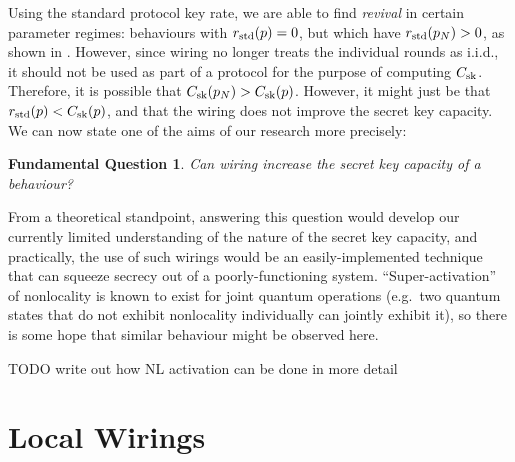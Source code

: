 \documentclass[10pt, a4paper]{article}
\numberwithin{equation}{section} %
\theoremstyle{definition}
\theoremstyle{plain}
\newtheorem{funqn}{Fundamental Question}
\newcommand{\?}{\mathrel{?}} %
\newcommand{\sk}{\rm sk}
\newcommand{\std}{\rm std}
\begin{document}
      Using the standard protocol key rate, we are able to find \emph{revival} in certain parameter regimes: behaviours with \(r_{\std}(p) = 0\), but which have \(r_{\std}(p_N) > 0\), as shown in . However, since wiring no longer treats the individual rounds as i.i.d., it should not be used as part of a protocol for the purpose of computing \(C_{\sk}\). Therefore, it is possible that \(C_{\sk}(p_N) > C_{\sk}(p)\). However, it might just be that \(r_{\std}(p) < C_{\sk}(p)\), and that the wiring does not improve the secret key capacity. We can now state one of the aims of our research more precisely:
      \begin{funqn}\label{fqn:wircap}
        Can wiring increase the secret key capacity of a behaviour?
      \end{funqn}

      From a theoretical standpoint, answering this question would develop our currently limited understanding of the nature of the secret key capacity, and practically, the use of such wirings would be an easily-implemented technique that can squeeze secrecy out of a poorly-functioning system. ``Super-activation'' of nonlocality is known to exist for joint quantum operations (e.g.\ two quantum states that do not exhibit nonlocality individually can jointly exhibit it), so there is some hope that similar behaviour might be observed here.

      TODO write out how NL activation can be done in more detail

      \section{Local Wirings}\label{sec:locwir}
\end{document}
